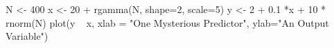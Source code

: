 \begin{Schunk}
\begin{Sinput}
 N <- 400
 x <- 20 + rgamma(N, shape=2, scale=5)
 y <- 2 + 0.1 *x + 10 * rnorm(N)
 plot(y ~ x, xlab = "One Mysterious Predictor", ylab="An Output Variable")
\end{Sinput}
\end{Schunk}
